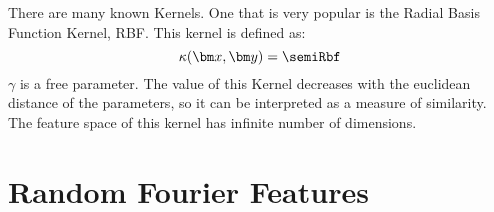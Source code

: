 \begin{pre-delivery}
There are many known Kernels. One that is very popular is the Radial Basis
Function Kernel, RBF. This kernel is defined as:
\begin{equation}
\kernel(\vx,\vy) = \semiRbf
\end{equation}
$\gamma$ is a free parameter. The value of this Kernel decreases with the
euclidean distance of the parameters, so it can be interpreted as a measure
of similarity. The feature space of this kernel has infinite number of
dimensions.


\end{pre-delivery}

\section{Random Fourier Features}
\section{\Nys}

